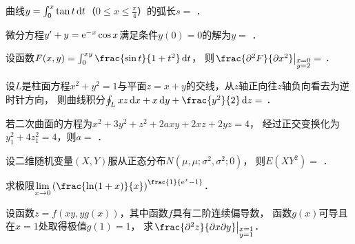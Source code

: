 \documentclass[plain,noanswer,medmath]{../../template/jnuexam}
\begin{document}


\begin{problem}
曲线$y = \int_0^x \tan t\mathop{}\!\mathrm{d} t$（$0 \le x \le \frac{\pi}{4}$）的弧长$s =$ \fillin{}．
\end{problem}


\begin{problem}
微分方程$y' + y = \mathrm{e}^{- x}\cos x$满足条件$y(0) = 0$的解为$y =$ \fillin{}．
\end{problem}


\begin{problem}
设函数$F(x,y) = \int_0^{xy} \frac{\sin t}{1 + t^2}\dt$，
则$\left. \frac{\pd^2 F}{\pd x^2} \right|_{\begin{subarray}{l}
  x = 0 \\
  y = 2
\end{subarray}} =$ \fillin{}．
\end{problem}


\begin{problem}
设$L$是柱面方程$x^2 + y^2 = 1$与平面$z = x + y$的交线，从$z$轴正向往$z$轴负向看去为逆时针方向，
则曲线积分$\oint_L xz\dx + x\dy + \frac{y^2}{2}\dz =$ \fillin{}．
\end{problem}


\begin{problem}
若二次曲面的方程为$x^2 + 3y^2 + z^2 + 2axy + 2xz + 2yz = 4$，
经过正交变换化为$y_1^2 + 4z_1^2 = 4$，则$a =$ \fillin{}．
\end{problem}


\begin{problem}
设二维随机变量$(X,Y)$服从正态分布$N\left(\mu,\mu;\sigma^2,\sigma^2;0\right)$，
则$E\left(XY^2\right) =$ \fillin{}．
\end{problem}




\begin{problem}[points=10]
求极限$\lim_{x \to 0} \left(\frac{\ln(1 + x)}{x} \right)^{\frac{1}{\e^x - 1}}$．
\end{problem}


\begin{problem}[points=9]
设函数$z = f(xy,yg(x))$，其中函数$f$具有二阶连续偏导数，
函数$g(x)$可导且在$x = 1$处取得极值$g(1) = 1$，
求$\left. \frac{\pd^2 z}{\pdx\pd y} \right|_{\begin{subarray}{l}
  x = 1 \\
  y = 1
\end{subarray}}$．
\end{problem}
\end{document}
